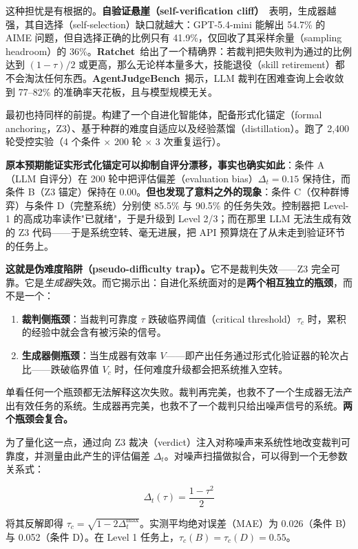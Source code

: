 \documentclass{article}
\begin{document}
这种担忧是有根据的。\textbf{自验证悬崖（self-verification cliff）}~\cite{self_verification_cliff}表明，生成器越强，其自选择（self-selection）缺口就越大：GPT-5.4-mini 能解出 54.7\% 的 AIME 问题，但自选择正确的比例只有 41.9\%，仅回收了其采样余量（sampling headroom）的 36\%。\textbf{Ratchet}~\cite{ratchet}给出了一个精确界：若裁判把失败判为通过的比例达到 $(1-\tau)/2$ 或更高，那么无论样本量多大，技能退役（skill retirement）都不会淘汰任何东西。\textbf{AgentJudgeBench}~\cite{agentjudgebench}揭示，LLM 裁判在困难查询上会收敛到 77--82\% 的准确率天花板，且与模型规模无关。

最初也持同样的前提。构建了一个自进化智能体，配备形式化锚定（formal anchoring，Z3）、基于种群的难度自适应以及经验蒸馏（distillation）。跑了 2,400 轮受控实验（4 个条件 $\times$ 200 轮 $\times$ 3 次重复运行）。

\textbf{原本预期能证实形式化锚定可以抑制自评分漂移，事实也确实如此}：条件 A（LLM 自评分）在 200 轮中把评估偏差（evaluation bias）$\Delta_t = 0.15$ 保持住，而条件 B（Z3 锚定）保持在 $0.00$。\textbf{但也发现了意料之外的现象}：条件 C（仅种群博弈）与条件 D（完整系统）分别使 85.5\% 与 90.5\% 的任务失效。控制器把 Level-1 的高成功率读作"已就绪"，于是升级到 Level 2/3；而在那里 LLM 无法生成有效的 Z3 代码——于是系统空转、毫无进展，把 API 预算烧在了从未走到验证环节的任务上。

\textbf{这就是伪难度陷阱（pseudo-difficulty trap）。}它不是裁判失效——Z3 完全可靠。它是\textit{生成器}失效。而它揭示出：自进化系统面对的是\textbf{两个相互独立的瓶颈}，而不是一个：

\begin{enumerate}
  \item \textbf{裁判侧瓶颈}：当裁判可靠度 $\tau$ 跌破临界阈值（critical threshold）$\tau_c$ 时，累积的经验中就会含有被污染的信号。
  \item \textbf{生成器侧瓶颈}：当生成器有效率 $V$——即产出任务通过形式化验证器的轮次占比——跌破临界值 $V_c$ 时，任何难度升级都会把系统推入空转。
\end{enumerate}

单看任何一个瓶颈都无法解释这次失败。裁判再完美，也救不了一个生成器无法产出有效任务的系统。生成器再完美，也救不了一个裁判只给出噪声信号的系统。\textbf{两个瓶颈会复合。}

为了量化这一点，通过向 Z3 裁决（verdict）注入对称噪声来系统性地改变裁判可靠度，并测量由此产生的评估偏差 $\Delta_t$。对噪声扫描做拟合，可以得到一个无参数关系式：

\[
  \Delta_t(\tau) = \frac{1-\tau^2}{2}
\]

将其反解即得 $\tau_c = \sqrt{1 - 2\Delta_t^{\max}}$。实测平均绝对误差（MAE）为 0.026（条件 B）与 0.052（条件 D）。在 Level 1 任务上，$\tau_c(B) = \tau_c(D) = 0.55$。
\end{document}
